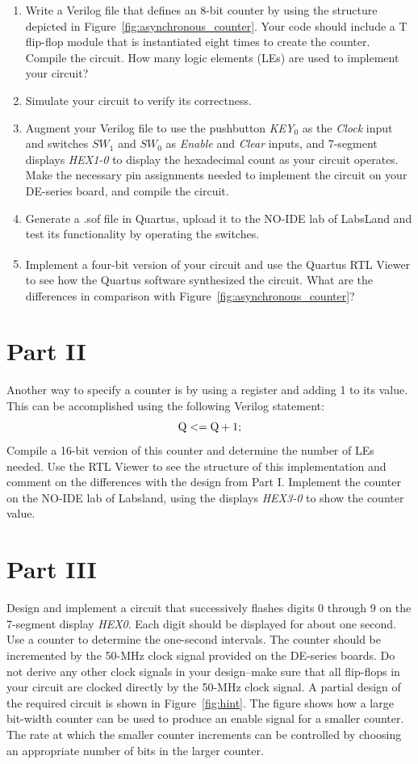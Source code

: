 \documentclass[epsfig,10pt,fullpage]{article}
\begin{document}
\begin{enumerate}
\item Write a Verilog file that defines an 8-bit counter by using the structure
depicted in Figure~\ref{fig:asynchronous_counter}. Your code should include a T 
flip-flop module that is instantiated
eight times to create the counter. Compile the circuit. How many logic elements (LEs) are 
used to implement your circuit? 
\item Simulate your circuit to verify its correctness.
\item Augment your Verilog file to use the pushbutton {\it KEY}$_0$ as the {\it Clock}
input and switches $SW_1$ and $SW_0$ as {\it Enable} and {\it Clear} inputs, and
7-segment displays {\it HEX1-0} to display the hexadecimal count as your circuit
operates. Make the necessary pin assignments needed to implement the circuit on your
DE-series board, and compile the circuit.
\item Generate a .sof file in Quartus, upload it to the NO-IDE lab of LabsLand and test its functionality by operating
the switches.
\item Implement a four-bit version of your circuit and use the Quartus\textsuperscript{\textregistered} RTL Viewer to
see how the Quartus software synthesized the circuit. What are the differences in
comparison with Figure~\ref{fig:asynchronous_counter}?
\end{enumerate}

\section*{Part II}
Another way to specify a counter is by using a register and adding 1 to its value. 
This can be accomplished using the following Verilog statement:
$$
{\rm Q <= Q + 1;}
$$
\noindent
Compile a 16-bit version of this counter and determine the number of LEs needed.  Use the RTL 
Viewer to see the structure of this implementation and comment on the differences with the 
design from Part I. Implement the counter on the NO-IDE lab of Labsland, using the displays 
{\it HEX3-0} to show the counter value.

\section*{Part III}
Design and implement a circuit that successively flashes digits 0 
through 9 on the 7-segment display {\it HEX0}. Each digit should be 
displayed for about one second. Use a counter to determine the one-second 
intervals. The counter should be incremented by the 50-MHz clock signal 
provided on the DE-series boards. Do not derive any other clock signals in your design--make 
sure that all flip-flops in your circuit are clocked directly by the 50-MHz clock signal.
A partial design of the required circuit is shown in Figure~\ref{fig:hint}. The figure
shows how a large bit-width counter can be used to produce an enable signal for a smaller
counter. The rate at which the smaller counter increments can be controlled by choosing an
appropriate number of bits in the larger counter.
\end{document}
